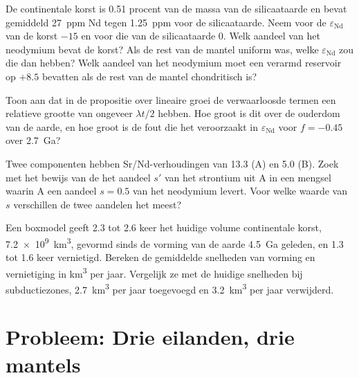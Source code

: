 \begin{exercise}[$\star\star$]\label{exo:b2:isotope-geochemistry:9}
De continentale korst is 0.51 procent van de massa van de silicaataarde en bevat
gemiddeld \qty{27}{ppm} Nd tegen \qty{1.25}{ppm} voor de silicaataarde. Neem
voor de $\varepsilon_{\mathrm{Nd}}$ van de korst $-15$ en voor die van de silicaataarde 0. Welk
aandeel van het neodymium bevat de korst? Als de rest van de mantel uniform was,
welke $\varepsilon_{\mathrm{Nd}}$ zou die dan hebben? Welk aandeel van het neodymium moet een
verarmd reservoir op $+8.5$ bevatten als de rest van de mantel chondritisch is?
\end{exercise}

\begin{exercise}[$\star\star\star$]\label{exo:b2:isotope-geochemistry:10}
Toon aan dat in de propositie over lineaire groei de verwaarloosde termen een relatieve
grootte van ongeveer $\lambda t/2$ hebben. Hoe groot is dit over de ouderdom van de aarde, en hoe
groot is de fout die het veroorzaakt in $\varepsilon_{\mathrm{Nd}}$ voor $f = -0.45$ over
\qty{2.7}{Ga}?
\end{exercise}

\begin{exercise}[$\star\star\star$]\label{exo:b2:isotope-geochemistry:11}
Twee componenten hebben Sr/Nd-verhoudingen van 13.3 (A) en 5.0 (B). Zoek met het bewijs van de
 het aandeel $s'$ van het strontium uit A in een mengsel waarin A
een aandeel $s = 0.5$ van het neodymium levert. Voor welke waarde van $s$ verschillen de twee
aandelen het meest?
\end{exercise}

\begin{exercise}[$\star\star\star$]\label{exo:b2:isotope-geochemistry:12}
Een boxmodel geeft 2.3 tot 2.6 keer het huidige volume continentale korst,
\qty{7.2e9}{km^3}, gevormd sinds de vorming van de aarde \qty{4.5}{Ga} geleden, en 1.3 tot 1.6
keer vernietigd. Bereken de gemiddelde snelheden van vorming en vernietiging in
\unit{km^3} per jaar. Vergelijk ze met de huidige snelheden bij subductiezones,
\qty{2.7}{km^3} per jaar toegevoegd en \qty{3.2}{km^3} per jaar verwijderd.
\end{exercise}

\section{Probleem: Drie eilanden, drie mantels}

